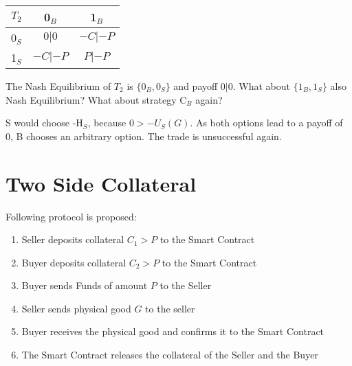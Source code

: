 \documentclass{cacthesis}
\begin{document}
\begin{center}
\begin{tabular}{ c||c|c| }
$T_2$& 0$_B$ & 1$_B$   \\
\hline
\hline
0$_S$ & $0 | 0$ & $-C|-P$ \\
\hline
1$_S$ & $-C|-P$ & $P | -P$\\ 
\hline
\end{tabular}
\end{center}

The Nash Equilibrium of $T_2$ is $\{0_B, 0_S\}$ and payoff $0 | 0$. What about $\{1_B, 1_S\}$ also Nash Equilibrium? What about strategy C$_B$ again?\newline

S would choose -H$_S$, because $0>-U_S(G)$.\newline
As both options lead to a payoff of 0, B chooses an arbitrary option. The trade is unsuccessful again.


\section{Two Side Collateral}
Following protocol is proposed:
\begin{enumerate}
    \item Seller  deposits collateral $C_1 > P$ to the Smart Contract
    \item Buyer  deposits collateral $C_2 > P$ to the Smart Contract
    \item Buyer sends Funds of amount $P$ to the Seller
    \item Seller sends physical good $G$ to the seller 
    \item Buyer receives the physical good and confirms it to the Smart Contract
    \item The Smart Contract releases the collateral of the Seller and the Buyer
\end{enumerate}


\end{document}
